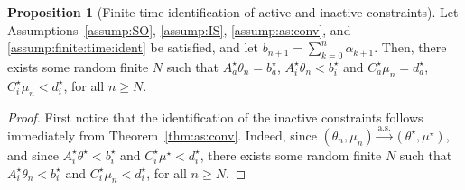 \documentclass[11pt,a4paper]{article}
\theoremstyle{definition}
\newtheorem{proposition}[theorem]{Proposition}
\begin{document}
\begin{proposition}[Finite-time identification of active and inactive constraints]
\label{prop:fin:time:ident}
Let Assumptions~\ref{assump:SO}, \ref{assump:IS}, \ref{assump:as:conv}, and \ref{assump:finite:time:ident} be satisfied, and let $b_{n+1} = \sum_{k=0}^n \alpha_{k+1}$. Then, there exists some random finite $N$ such that $A_{a}^\star \theta_n = b_a^\star$, $A_{i}^\star \theta_n < b_i^\star$ and $C_{a}^\star \mu_n = d_a^\star$, $C_{i}^\star \mu_n < d_i^\star$, for all $n \geq N$.
\end{proposition}
\begin{proof}
First notice that the identification of the inactive constraints follows immediately from Theorem~\ref{thm:as:conv}. Indeed, since $(\theta_n,\mu_n) \overset{\text{a.s.}}{\to} (\theta^\star,\mu^\star)$, and since $A_{i}^\star \theta^\star < b_i^\star$ and $C_{i}^\star \mu^\star < d_i^\star$, there exists some random finite $N$ such that $A_{i}^\star \theta_n < b_i^\star$ and $C_{i}^\star \mu_n < d_i^\star$, for all $n \geq N$.


\end{proof}
\end{document}
